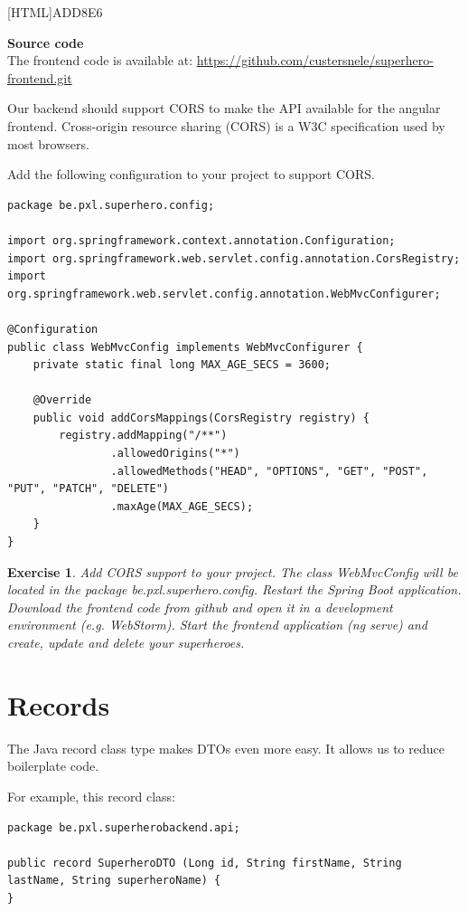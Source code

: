 \documentclass[a4paper, 12pt]{report}
\newenvironment{boxexercise}
{\begin{tcolorbox}
[enhanced jigsaw,breakable,pad at break*=1mm,
 colback=tsyellow!20,boxrule=0pt,frame hidden]}
{\end{tcolorbox}}
\newtheorem{envoefening}{\textbf{Exercise}}[chapter]
\newenvironment{oefening}
               {\begin{boxexercise}\begin{envoefening}}
               {\end{envoefening}\end{boxexercise}}
\begin{document}
 [HTML]{ADD8E6}{\parbox{\textwidth}{%
\noindent \textbf{Source code}\\
The frontend code is available at: \url{https://github.com/custersnele/superhero-frontend.git}
}}

Our backend should support CORS to make the API available for the angular frontend.  Cross-origin resource sharing (CORS) is a W3C specification used by most browsers.  

Add the following configuration to your project to support CORS.

\begin{lstlisting}[frame=single]
package be.pxl.superhero.config;

import org.springframework.context.annotation.Configuration;
import org.springframework.web.servlet.config.annotation.CorsRegistry;
import org.springframework.web.servlet.config.annotation.WebMvcConfigurer;

@Configuration
public class WebMvcConfig implements WebMvcConfigurer {
    private static final long MAX_AGE_SECS = 3600;

    @Override
    public void addCorsMappings(CorsRegistry registry) {
        registry.addMapping("/**")
                .allowedOrigins("*")
                .allowedMethods("HEAD", "OPTIONS", "GET", "POST", "PUT", "PATCH", "DELETE")
                .maxAge(MAX_AGE_SECS);        
    }
}
\end{lstlisting}

\begin{oefening}
Add CORS support to your project. The class WebMvcConfig will be located in the package  \textit{be.pxl.superhero.config}.  Restart the Spring Boot application.
Download the frontend code from github and open it in a  development environment (e.g.  WebStorm).  Start the frontend application (ng serve) and create, update and delete your superheroes.
\end{oefening}

\section{Records}

The Java record class type makes DTOs even more easy. It allows us to reduce boilerplate code. 

For example, this record class:

\begin{lstlisting}
package be.pxl.superherobackend.api;

public record SuperheroDTO (Long id, String firstName, String lastName, String superheroName) {
}
\end{lstlisting} 
\end{document}
